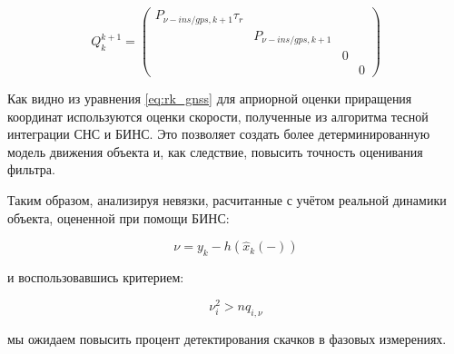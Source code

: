 \begin{equation*}
	\label{eq:Q_k}
	{Q}_k^{k+1} = 
	\begin{pmatrix}
		{P}_{\nu-ins/gps,k+1} \tau_r & & & \\
		& {P}_{\nu-ins/gps,k+1}  & & \\
		& & 0 & \\
		& & & 0
	\end{pmatrix}
\end{equation*}	

Как видно из уравнения \ref{eq:rk_gnss} для априорной оценки приращения координат используются оценки скорости, полученные из алгоритма тесной интеграции СНС и БИНС. Это позволяет создать более детерминированную модель движения объекта и, как следствие, повысить точность оценивания фильтра. 


Таким образом, анализируя невязки, расчитанные с учётом реальной динамики объекта, оцененной при помощи БИНС: 

\begin{equation}
	\label{eq:ins_23.1}
	\nu = y_k - h(\hat{x}_k(-))			
\end{equation}

и воспользовавшись критерием: 

\begin{equation}
	\label{eq:ins_24}
	\nu_i^2 > nq_{i, \nu}
\end{equation}

мы ожидаем повысить процент детектирования скачков в фазовых измерениях. 

\newpage 
 